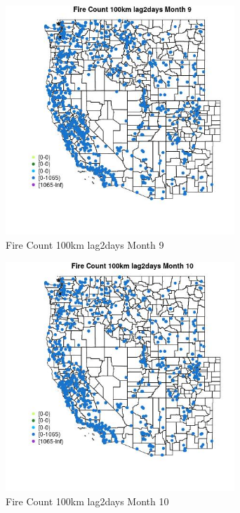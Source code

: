 \begin{figure} 
\centering  
\includegraphics[width=0.77\textwidth]{Code_Outputs/Report_ML_input_PM25_Step4_part_f_de_duplicated_aveswNAs_MapObsMo9Fire_Count_100km_lag2days.jpg} 
\caption{\label{fig:Report_ML_input_PM25_Step4_part_f_de_duplicated_aveswNAsMapObsMo9Fire_Count_100km_lag2days}Fire Count 100km lag2days Month 9} 
\end{figure} 
 

\begin{figure} 
\centering  
\includegraphics[width=0.77\textwidth]{Code_Outputs/Report_ML_input_PM25_Step4_part_f_de_duplicated_aveswNAs_MapObsMo10Fire_Count_100km_lag2days.jpg} 
\caption{\label{fig:Report_ML_input_PM25_Step4_part_f_de_duplicated_aveswNAsMapObsMo10Fire_Count_100km_lag2days}Fire Count 100km lag2days Month 10} 
\end{figure} 
 

